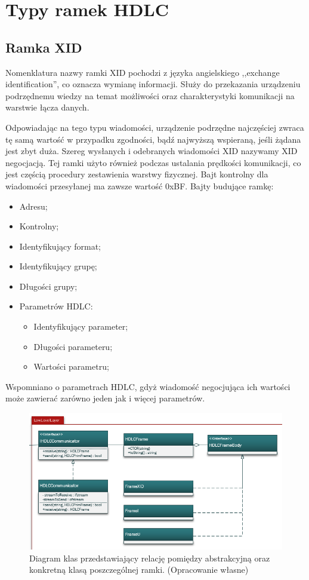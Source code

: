 \section{Typy ramek HDLC}
	\subsection{Ramka XID}
	Nomenklatura nazwy ramki XID pochodzi z języka angielskiego ,,exchange identification'', co oznacza wymianę informacji. 
	Służy do przekazania urządzeniu podrzędnemu wiedzy na temat możliwości oraz charakterystyki komunikacji na warstwie łącza danych.
	
	Odpowiadając na tego typu wiadomości, urządzenie podrzędne najczęściej zwraca tę samą wartość w przypadku zgodności, 
	bądź najwyższą wspieraną, jeśli żądana jest zbyt duża. Szereg wysłanych i odebranych wiadomości XID nazywamy XID negocjacją.
	Tej ramki użyto również podczas ustalania prędkości komunikacji, co jest częścią procedury zestawienia warstwy fizycznej.
	Bajt kontrolny dla wiadomości przesyłanej ma zawsze wartość 0xBF. \newline
	Bajty budujące ramkę:
	\begin{itemize}
		\item Adresu;
		\item Kontrolny;
		\item Identyfikujący format;
		\item Identyfikujący grupę;
		\item Długości grupy;
		\item Parametrów HDLC:
		\begin{itemize}
			\item Identyfikujący parameter;
			\item Długości parameteru;
			\item Wartości parametru;
		\end{itemize}
	\end{itemize} 
	Wspomniano o parametrach HDLC, gdyż wiadomość negocjująca ich wartości może zawierać zarówno jeden jak i więcej parametrów.

	\begin{figure}[h!]
         \centering
         \includegraphics[scale=0.75]{Obrazki/DiagramyKlas/LowLevel.png}
         \caption{Diagram klas przedstawiający relację pomiędzy abstrakcyjną oraz konkretną klasą poszczególnej ramki.
             \newline(Opracowanie własne)}
    \end{figure}